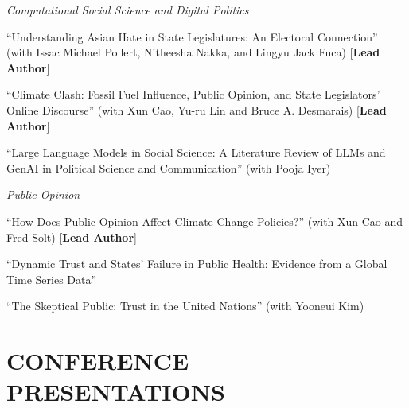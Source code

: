 \documentclass[10.5pt,]{article}
\providecommand{\tightlist}{%
	\setlength{\itemsep}{0pt}\setlength{\parskip}{0pt}}
\renewenvironment{itemize}{
	\begin{list}{}{
			\setlength{\leftmargin}{1.5em}
		}
	}{
	\end{list}
}
\begin{document}
\begin{itemize}
  \begin{itemize}
  \tightlist
  \item
    \emph{Computational Social Science and Digital Politics}
  \item
    ``Understanding Asian Hate in State Legislatures: An Electoral
    Connection'' (with Issac Michael Pollert, Nitheesha Nakka, and
    Lingyu Jack Fuca) {[}\textbf{Lead Author}{]}
  \item
    ``Climate Clash: Fossil Fuel Influence, Public Opinion, and State
    Legislators' Online Discourse'' (with Xun Cao, Yu-ru Lin and Bruce
    A. Desmarais) {[}\textbf{Lead Author}{]}
  \item
    ``Large Language Models in Social Science: A Literature Review of
    LLMs and GenAI in Political Science and Communication'' (with Pooja
    Iyer)
  \item
    \emph{Public Opinion}
  \item
    ``How Does Public Opinion Affect Climate Change Policies?'' (with
    Xun Cao and Fred Solt) {[}\textbf{Lead Author}{]}
  \item
    ``Dynamic Trust and States' Failure in Public Health: Evidence from
    a Global Time Series Data''
  \item
    ``The Skeptical Public: Trust in the United Nations'' (with Yooneui
    Kim)
  \end{itemize}
\end{itemize}

\section{CONFERENCE PRESENTATIONS}\label{conference-presentations}
\end{document}
